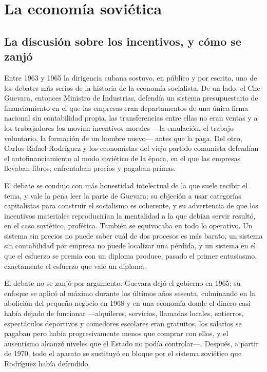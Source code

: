 \chapter{La economía soviética}
\label{ch:sovieteconomy}

\section{La discusión sobre los incentivos, y cómo se zanjó}

Entre 1963 y 1965 la dirigencia cubana sostuvo, en público y por escrito, uno de
los debates más serios de la historia de la economía socialista. De un lado, el
Che Guevara, entonces Ministro de Industrias, defendía un sistema presupuestario
de financiamiento en el que las empresas eran departamentos de una única firma
nacional sin contabilidad propia, las transferencias entre ellas no eran ventas y
a los trabajadores los movían incentivos morales ---la emulación, el trabajo
voluntario, la formación de un hombre nuevo--- antes que la paga. Del otro,
Carlos Rafael Rodríguez y los economistas del viejo partido comunista defendían
el autofinanciamiento al modo soviético de la época, en el que las empresas
llevaban libros, enfrentaban precios y pagaban primas.

El debate se condujo con más honestidad intelectual de la que suele recibir el
tema, y vale la pena leer la parte de Guevara; su objeción a usar categorías
capitalistas para construir el socialismo es coherente, y su advertencia de que
los incentivos materiales reproducirían la mentalidad a la que debían servir
resultó, en el caso soviético, profética. También se equivocaba en todo lo
operativo. Un sistema sin precios no puede saber cuál de dos procesos es más
barato, un sistema sin contabilidad por empresa no puede localizar una pérdida, y
un sistema en el que el esfuerzo se premia con un diploma produce, pasado el
primer entusiasmo, exactamente el esfuerzo que vale un diploma.

El debate no se zanjó por argumento. Guevara dejó el gobierno en 1965; su enfoque
se aplicó al máximo durante los últimos años sesenta, culminando en la abolición
del pequeño negocio en 1968 y en una economía donde el dinero casi había dejado
de funcionar ---alquileres, servicios, llamadas locales, entierros,
espectáculos deportivos y comedores escolares eran gratuitos, los salarios se
pagaban pero había progresivamente menos que comprar con ellos, y el ausentismo
alcanzó niveles que el Estado no podía controlar---. Después, a partir de 1970,
todo el aparato se sustituyó en bloque por el sistema soviético que Rodríguez
había defendido.

